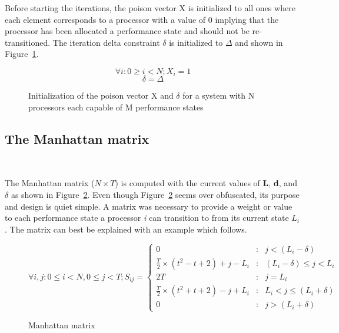 Before starting the iterations, the poison vector X is initialized to all ones where
each element corresponds to a processor with a value of 0 implying that the processor
has been allocated a performance state and should not be re-transitioned. 
The iteration delta constraint $\delta$ is initialized to $\Delta$ and shown 
in Figure~\ref{fig:init_X}.

\begin{figure}[h!]
\centering
\begin{equation*}
    \forall i : 0 \geq i < N; X_{i} = 1 
\end{equation*}
\begin{equation*}
    \delta = \Delta
\end{equation*}
\caption{Initialization of the poison vector X and $\delta$ for a system with N processors each capable of M performance states}
\label{fig:init_X}
\end{figure}

\subsection{The Manhattan matrix}~\label{sec:delta_matrix}

The Manhattan matrix ($N \times T$) is computed with the current values of \textbf{L}, \textbf{d}, and 
$\delta$ as shown in Figure~\ref{fig:delta_mat}. Even though Figure~\ref{fig:delta_mat} seems over 
obfuscated, its purpose and design is quiet simple. A matrix was necessary to provide a weight or value
to each performance state a processor \textit{i} can transition to from its current state $L_i$. The
matrix can best be explained with an example which follows.

\begin{figure}[h!]
\centering
\begin{equation*}
    \forall i,j: 0 \leq i < N, 0 \leq j < T; S_{ij} = \left\{
     \begin{array}{lcr}
       0 & : & j < (L_{i} - \delta) \\
       \frac{T}{2} \times (t^{2} - t + 2) + j - L_{i} & : & (L_{i} - \delta) \leq j < L_{i} \\
       2T & : & j = L_{i}\\
       \frac{T}{2} \times (t^{2} + t + 2) - j + L_{i} & : & L_{i} < j \leq (L_{i} + \delta) \\
       0 & : & j > (L_{i} + \delta)
     \end{array}
   \right.
\end{equation*}
\caption{Manhattan matrix}
\label{fig:delta_mat}
\end{figure}

